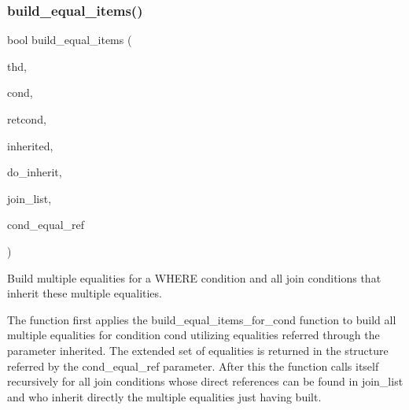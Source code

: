 \subsubsection{\texorpdfstring{build\+\_\+equal\+\_\+items()}{build\_equal\_items()}}
{\footnotesize\ttfamily bool build\+\_\+equal\+\_\+items (\begin{DoxyParamCaption}\item[{T\+HD $\ast$}]{thd,  }\item[{\mbox{\hyperlink{classItem}{Item}} $\ast$}]{cond,  }\item[{\mbox{\hyperlink{classItem}{Item}} $\ast$$\ast$}]{retcond,  }\item[{C\+O\+N\+D\+\_\+\+E\+Q\+U\+AL $\ast$}]{inherited,  }\item[{bool}]{do\+\_\+inherit,  }\item[{\mbox{\hyperlink{classList}{List}}$<$ \mbox{\hyperlink{structTABLE__LIST}{T\+A\+B\+L\+E\+\_\+\+L\+I\+ST}} $>$ $\ast$}]{join\+\_\+list,  }\item[{C\+O\+N\+D\+\_\+\+E\+Q\+U\+AL $\ast$$\ast$}]{cond\+\_\+equal\+\_\+ref }\end{DoxyParamCaption})}

Build multiple equalities for a W\+H\+E\+RE condition and all join conditions that inherit these multiple equalities.

The function first applies the build\+\_\+equal\+\_\+items\+\_\+for\+\_\+cond function to build all multiple equalities for condition cond utilizing equalities referred through the parameter inherited. The extended set of equalities is returned in the structure referred by the cond\+\_\+equal\+\_\+ref parameter. After this the function calls itself recursively for all join conditions whose direct references can be found in join\+\_\+list and who inherit directly the multiple equalities just having built.

